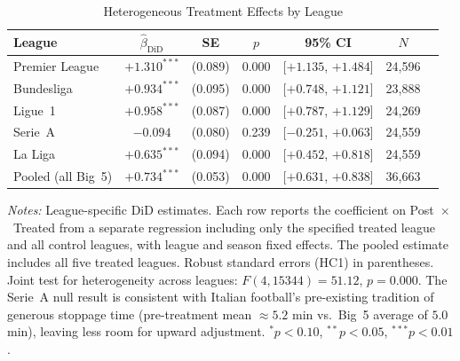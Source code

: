 \begin{table}[htbp]
\centering
\begin{threeparttable}
\caption{Heterogeneous Treatment Effects by League}
\label{tab:league_did}
\begin{tabular}{lcccccc}
\toprule
League & $\hat{\beta}_{\text{DiD}}$ & SE & $p$ & 95\% CI & $N$ \\
\midrule
Premier League & $+1.310^{***}$ & (0.089) & 0.000 & [$+1.135$, $+1.484$] & 24,596 \\
Bundesliga & $+0.934^{***}$ & (0.095) & 0.000 & [$+0.748$, $+1.121$] & 23,888 \\
Ligue~1 & $+0.958^{***}$ & (0.087) & 0.000 & [$+0.787$, $+1.129$] & 24,269 \\
Serie~A & $-0.094$ & (0.080) & 0.239 & [$-0.251$, $+0.063$] & 24,559 \\
La Liga & $+0.635^{***}$ & (0.094) & 0.000 & [$+0.452$, $+0.818$] & 24,559 \\
\midrule
Pooled (all Big~5) & $+0.734^{***}$ & (0.053) & 0.000 & [$+0.631$, $+0.838$] & 36,663 \\
\bottomrule
\end{tabular}
\begin{tablenotes}[flushleft]
\footnotesize
\item \textit{Notes:} League-specific DiD estimates. Each row reports the coefficient
on Post~$\times$~Treated from a separate regression including only the specified
treated league and all control leagues, with league and season fixed effects.
The pooled estimate includes all five treated leagues. Robust standard errors
(HC1) in parentheses. Joint test for heterogeneity across leagues:
$F(4, 15344) = 51.12$, $p = 0.000$. The Serie~A null result is consistent with
Italian football's pre-existing tradition of generous stoppage time (pre-treatment
mean $\approx 5.2$ min vs.\ Big~5 average of $5.0$ min), leaving less room for
upward adjustment. $^{*}p<0.10$, $^{**}p<0.05$, $^{***}p<0.01$.
\end{tablenotes}
\end{threeparttable}
\end{table}


